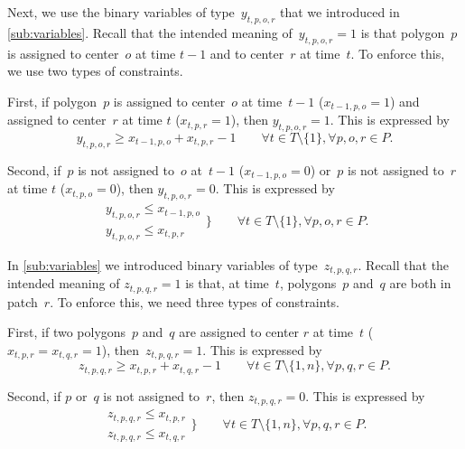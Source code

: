 Next, we use the binary variables of type~$y_{t,p,o,r}$ that we
introduced in \sect\ref{sub:variables}.  Recall that the 
intended 
meaning of~$y_{t,p,o,r}=1$ is that polygon~$p$ is assigned to
center~$o$ at time $t-1$ and to center~$r$ at time~$t$.
To enforce this, we use two types of constraints.

First, if polygon~$p$ is assigned 
to center~$o$ at time~$t-1$ ($x_{t-1,p,o}=1$)
and assigned to center~$r$ at time $t$
($x_{t,p,r}=1$), then $y_{t,p,o,r}=1$.  This is expressed by
\begin{equation}
\label{eq:CstrY1}
y_{t,p,o,r}\geq x_{t-1,p,o}+x_{t,p,r}-1 \qquad
\forall t \in {T} \setminus \{1\}, 
\forall p, o, r \in P.
\end{equation}

Second, if~$p$ is not assigned to~$o$ at~$t-1$ ($x_{t-1,p,o}=0$)
or~$p$ is not assigned to~$r$ at time $t$ ($x_{t,p,o}=0$),
then $y_{t,p,o,r}=0$.
This is expressed by
\begin{equation}
\label{eq:CstrY2}
\begin{array}{l}
y_{t,p,o,r} \le x_{t-1,p,o} \\
y_{t,p,o,r} \le x_{t,p,r}
\end{array} 
\bigg\} \qquad 
\forall t\in T\setminus \{1\}, 
\forall	p,o,r \in P.	
\end{equation}


In \sect\ref{sub:variables} we introduced binary variables of 
type~$z_{t,p,q,r}$.
Recall that the intended meaning of $z_{t,p,q,r}=1$ is that, at
time~$t$, polygons~$p$ and~$q$ are both in patch~$r$.
To enforce this, we need three types of constraints.

First, if two polygons~$p$ and~$q$ are assigned 
to center $r$ at time~$t$ ($x_{t,p,r}=x_{t,q,r}=1$),
then~$z_{t,p,q,r}=1$.  This is expressed by
\begin{equation}
\label{eq:CstrZ1}
z_{t,p,q,r}\geq x_{t,p,r}+x_{t,q,r}-1 \qquad
\forall t \in T \setminus \{1,n\}, 
\forall p, q, r \in P.
\end{equation}

Second, if $p$ or~$q$ is not assigned to~$r$,
then $z_{t,p,q,r}=0$.  This is expressed by
\begin{equation}
\label{eq:CstrZ2}
\begin{array}{l}
z_{t,p,q,r} \le x_{t,p,r} \\
z_{t,p,q,r} \le x_{t,q,r}
\end{array} 
\bigg\} \qquad 
\forall t\in T \setminus \{1,n\}, 
\forall	p,q,r \in P.	
\end{equation}

